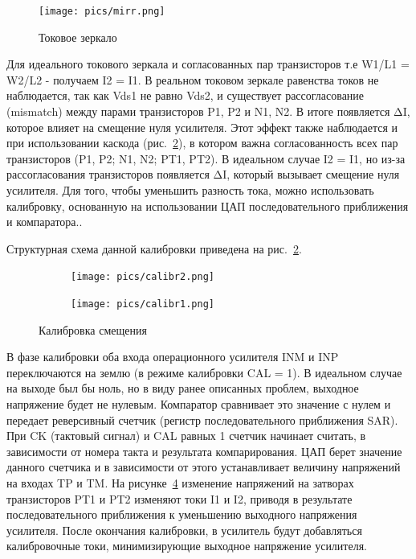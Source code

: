 \documentclass[a4paper,12pt,oneside]{scrartcl}
\begin{document}
\begin{figure}[!htb]
\centering
\texttt{[image: pics/mirr.png]}
\caption{Токовое зеркало}
\label{fig:Mirr}
\end{figure}
\FloatBarrier
Для идеального токового зеркала и согласованных пар транзисторов  т.е W1/L1 = W2/L2 - получаем I2 = I1. В реальном токовом зеркале равенства токов не наблюдается, так как Vds1 не равно Vds2, и существует рассогласование (mismatch) между парами транзисторов  P1, P2 и N1, N2. В итоге появляется ΔI, которое влияет на смещение нуля усилителя. 
Этот эффект также наблюдается и при использовании каскода (рис.~\ref{fig:Cal1}), в котором важна согласованность всех пар транзисторов (P1, P2; N1, N2; PT1, PT2). В идеальном случае I2 = I1, но из-за рассогласования транзисторов появляется ΔI, который вызывает смещение нуля усилителя.  Для того, чтобы уменьшить разность тока, можно использовать калибровку, основанную на использовании ЦАП последовательного приближения и компаратора..~\cite{B11}

Структурная схема данной калибровки приведена на рис.~\ref{fig:Cal1}.

\begin{figure}[!htb]
    \begin{subfigure}[b]{0.45\textwidth}
        \texttt{[image: pics/calibr2.png]}
        \label{fig:Cal1}
    \end{subfigure}
    \begin{subfigure}[b]{0.45\textwidth}
        \texttt{[image: pics/calibr1.png]}
        \label{fig:Cal2}
    \end{subfigure}
    \caption{Калибровка смещения} 
\end{figure}
\FloatBarrier

В фазе калибровки оба входа операционного усилителя INM и INP переключаются на землю (в режиме калибровки CAL = 1). В идеальном случае на выходе был бы ноль, но в виду ранее описанных проблем, выходное напряжение будет не нулевым. Компаратор сравнивает это значение с нулем и передает реверсивный счетчик (регистр последовательного приближения SAR). При CK (тактовый сигнал) и CAL равных 1 счетчик начинает считать, в зависимости от номера такта и результата компарирования. ЦАП берет значение данного счетчика и в зависимости от этого  устанавливает величину напряжений на входах TP и TM. На рисунке~\ref{fig:Cal2} изменение напряжений на затворах транзисторов PT1 и PT2 изменяют токи I1 и I2, приводя в результате последовательного приближения к уменьшению выходного напряжения усилителя. После окончания калибровки, в усилитель будут добавляться калибровочные токи, минимизирующие выходное напряжение усилителя.
\end{document}
